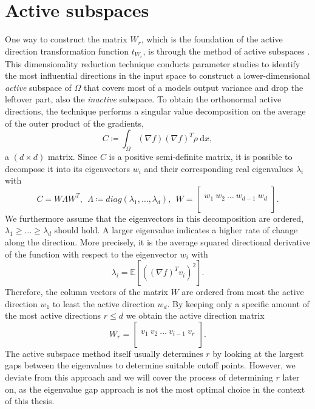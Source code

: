 \documentclass[
  a4paper,  %
  twoside,  %
  bibliography=totoc,
  headsepline,
  cleardoublepage=empty,
  parskip=half,
  draft=false
]{scrbook}
\begin{document}
\section{Active subspaces}
\label{sec:as}

One way to construct the matrix $W_r$, which is the foundation of the active direction transformation function $t_{W_r}$, is through the method of active subspaces \cite{Constantine2015}.
This dimensionality reduction technique conducts parameter studies to identify the most influential directions in the input space to construct a lower-dimensional \textit{active} subspace of $\Omega$ that covers most of a models output variance and drop the leftover part, also \ie the \textit{inactive} subspace.
To obtain the orthonormal active directions, the technique performs a singular value decomposition on the average of the outer product of the gradients,
\begin{equation}
C \coloneqq \int_{\Omega} (\nabla f) (\nabla f)^T \rho ~ \mathrm{d}x,
\label{eq:as_c}
\end{equation}
a $(d \times d)$ matrix.
Since $C$ is a positive semi-definite matrix, it is possible to decompose it into its eigenvectors $w_i$ and their corresponding real eigenvalues $\lambda_i$ with
\begin{equation}
C = W \Lambda W^T, ~~ \Lambda \coloneqq diag(\lambda_1, \dots, \lambda_d), ~~ W =
  \begin{bmatrix}
  \\
    w_1 ~ w_2 ~ \dots ~ w_{d-1} ~ w_d\\
    \\
  \end{bmatrix}.
\end{equation}
%
We furthermore assume that the eigenvectors in this decomposition are ordered, \ie $\lambda_1 \geq \dots \geq \lambda_d$ should hold.
A larger eigenvalue indicates a higher rate of change along the direction.
More precisely, it is the average squared directional derivative of the function with respect to the eigenvector $w_i$ \cite{Constantine2014} with
\begin{equation}
\lambda_i=\mathds{E}\left[\left(\left(\nabla f\right)^T v_i\right)^2\right].
\label{eigenvalues}
\end{equation}
%
Therefore, the column vectors of the matrix $W$ are ordered from most the active direction $w_1$ to least the active direction $w_d$.
By keeping only a specific amount of the most active directions $r \leq d$ we obtain the active direction matrix
\begin{equation}
W_r=\begin{bmatrix}
  \\
    v_1 ~ v_2 ~ \dots ~ v_{i-1} ~ v_r\\
    \\
  \end{bmatrix}.
\label{basis}
\end{equation}
%
The active subspace method itself usually determines $r$ by looking at the largest gaps between the eigenvalues to determine suitable cutoff points.
However, we deviate from this approach and we will cover the process of determining $r$ later on, as the eigenvalue gap approach is not the most optimal choice in the context of this thesis.
\end{document}
